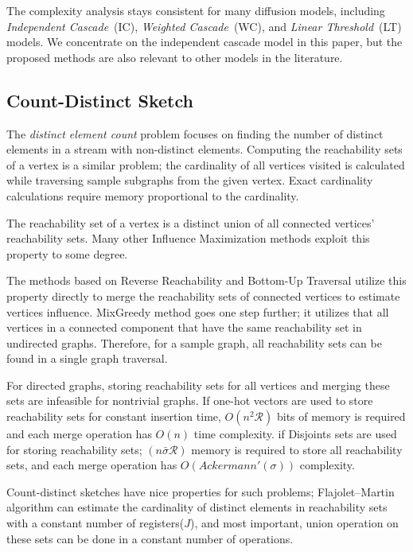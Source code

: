 \documentclass[10pt,journal,compsoc]{IEEEtran}
\begin{document}
The complexity analysis stays consistent for many diffusion models, including {\em Independent Cascade}~(IC), {\em Weighted Cascade}~(WC), and {\em Linear Threshold}~(LT)  models. We concentrate on the independent cascade model in this paper, but the proposed methods are also relevant to other models in the literature.

\subsection{Count-Distinct Sketch}\label{sec:sketch}
The {\em distinct element count} problem focuses on finding the number of distinct elements in a stream with non-distinct elements. Computing the reachability sets of a vertex is a similar problem; the cardinality of all vertices visited is calculated while traversing sample subgraphs from the given vertex. Exact cardinality calculations require memory proportional to the cardinality. 

The reachability set of a vertex is a distinct union of all connected vertices' reachability sets. Many other Influence Maximization methods exploit this property to some degree. 

The methods based on Reverse Reachability and Bottom-Up Traversal utilize this property directly to merge the reachability sets of connected vertices to estimate vertices influence.
MixGreedy method goes one step further; it utilizes that all vertices in a connected component that have the same reachability set in undirected graphs. Therefore, for a sample graph, all reachability sets can be found in a single graph traversal. 

For directed graphs, storing reachability sets for all vertices and merging these sets are infeasible for nontrivial graphs. 
If one-hot vectors are used to store reachability sets for constant insertion time, $O(n^2\mathcal{R})$ bits of memory is required and each merge operation has $O(n)$ time complexity. 
if Disjoints sets are used for storing reachability sets; $(n\bar{\sigma}\mathcal{R})$ memory is required to store all reachability sets, and each merge operation has $O(Ackermann'(\sigma))$ complexity.

Count-distinct sketches have nice properties for such problems; Flajolet–Martin algorithm\cite{flajolet1985probabilistic} can estimate the cardinality of distinct elements in reachability sets with a constant number of registers($J$), and most important, union operation on these sets can be done in a constant number of operations.
\end{document}
